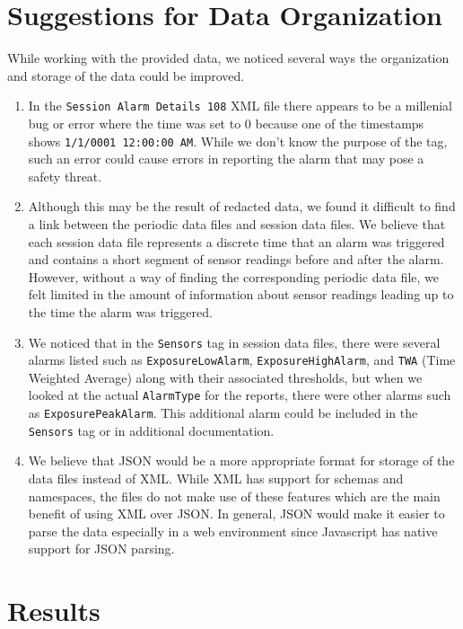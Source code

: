 \documentclass[twoside,twocolumn]{article}
\begin{document}

\section{Suggestions for Data Organization}

While working with the provided data, we noticed several ways the organization and storage of the data could be improved.
\begin{enumerate}[leftmargin=*]
\item In the \texttt{Session Alarm Details 108} XML file there appears to be a millenial bug or error where the time was set to 0 because one of the timestamps shows \texttt{1/1/0001 12:00:00 AM}. While we don't know the purpose of the tag, such an error could cause errors in reporting the alarm that may pose a safety threat.
\item Although this may be the result of redacted data, we found it difficult to find a link between the periodic data files and session data files. We believe that each session data file represents a discrete time that an alarm was triggered and contains a short segment of sensor readings before and after the alarm. However, without a way of finding the corresponding periodic data file, we felt limited in the amount of information about sensor readings leading up to the time the alarm was triggered.
\item We noticed that in the \texttt{Sensors} tag in session data files, there were several alarms listed such as \texttt{ExposureLowAlarm}, \texttt{ExposureHighAlarm}, and \texttt{TWA} (Time Weighted Average) along with their associated thresholds, but when we looked at the actual \texttt{AlarmType} for the reports, there were other alarms such as \texttt{ExposurePeakAlarm}. This additional alarm could be included in the \texttt{Sensors} tag or in additional documentation.
\item We believe that JSON would be a more appropriate format for storage of the data files instead of XML. While XML has support for schemas and namespaces, the files do  not make use of these features which are the main benefit of using XML over JSON. In general, JSON would make it easier to parse the data especially in a web environment since Javascript has native support for JSON parsing.
\end{enumerate}


\section{Results}
\end{document}
